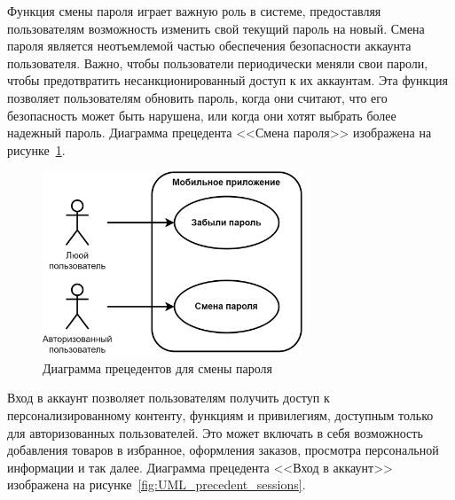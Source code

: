 Функция смены пароля играет важную роль в системе, предоставляя пользователям возможность изменить свой текущий пароль на новый.
Смена пароля является неотъемлемой частью обеспечения безопасности аккаунта пользователя.
Важно, чтобы пользователи периодически меняли свои пароли,
чтобы предотвратить несанкционированный доступ к их аккаунтам.
Эта функция позволяет пользователям обновить пароль, когда они считают,
что его безопасность может быть нарушена, или когда они хотят выбрать более надежный пароль.
Диаграмма прецедента <<Смена пароля>> изображена на рисунке~\ref{fig:UML_precedent_change_password}.

\begin{figure}[!htb]
    \centering

    \includegraphics[height=5.5cm]
    {images/UML/UML_precedent_change_password.png}

    \caption{Диаграмма прецедентов для смены пароля}

    \label{fig:UML_precedent_change_password}
\end{figure}

Вход в аккаунт позволяет пользователям получить доступ к персонализированному контенту, функциям и привилегиям,
доступным только для авторизованных пользователей.
Это может включать в себя возможность добавления товаров в избранное, оформления заказов,
просмотра персональной информации и так далее.
Диаграмма прецедента <<Вход в аккаунт>> изображена на рисунке~\ref{fig:UML_precedent_sessions}.

